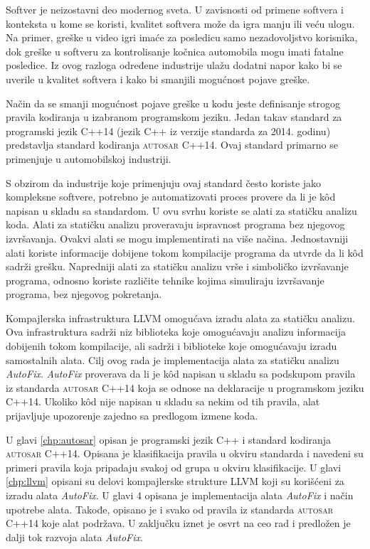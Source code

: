 \documentclass[12pt,oneside]{memoir}
\begin{document}
Softver je neizostavni deo modernog sveta. U zavisnosti od primene softvera i konteksta u kome se koristi, kvalitet softvera mo\v{z}e da igra
manju ili ve\'{c}u ulogu. Na primer, gre\v{s}ke u video igri ima\'{c}e za posledicu samo nezadovoljstvo korisnika, dok gre\v{s}ke u softveru
za kontrolisanje ko\v{c}nica automobila mogu imati fatalne posledice. Iz ovog razloga određene industrije ula\v{z}u dodatni napor kako bi se uverile u kvalitet softvera
i kako bi smanjili mogu\'{c}nost pojave gre\v{s}ke. \par
Na\v{c}in da se smanji mogu\'{c}nost pojave gre\v{s}ke u kodu jeste definisanje strogog pravila kodiranja u
izabranom programskom jeziku. Jedan takav standard za programski jezik C++14 (jezik C++ iz verzije standarda za 2014. godinu) predstavlja standard kodiranja \textsc{autosar} C++14. Ovaj standard primarno se primenjuje u automobilskoj industriji. \par
S obzirom da industrije koje primenjuju ovaj standard \v{c}esto koriste jako kompleksne softvere, potrebno je automatizovati proces provere da li je k\^{o}d napisan u skladu sa standardom. U ovu svrhu koriste
se alati za stati\v{c}ku analizu koda. Alati za stati\v{c}ku analizu proveravaju ispravnost programa bez njegovog izvr\v{s}avanja. Ovakvi alati se mogu implementirati na
vi\v{s}e na\v{c}ina. Jednostavniji alati koriste informacije dobijene tokom kompilacije programa da utvrde da li k\^{o}d sadr\v{z}i gre\v{s}ku. Napredniji alati za stati\v{c}ku analizu vr\v{s}e i simboli\v{c}ko izvr\v{s}avanje programa, odnosno koriste razli\v{c}ite tehnike kojima simuliraju izvr\v{s}avanje programa, bez njegovog pokretanja.
\par
Kompajlerska infrastruktura LLVM omogu\'{c}ava izradu alata za stati\v{c}ku analizu. Ova infrastruktura sadr\v{z}i niz biblioteka koje omogu\'{c}avaju analizu informacija dobijenih tokom kompilacije, ali sadr\v{z}i i biblioteke koje omogu\'{c}avaju izradu samostalnih alata. Cilj ovog rada je implementacija alata za stati\v{c}ku analizu
\textit{AutoFix}. \textit{AutoFix} proverava da li je k\^{o}d napisan u skladu sa podskupom pravila iz standarda \textsc{autosar} C++14 koja se odnose na deklaracije u programskom jeziku C++14. Ukoliko k\^{o}d nije napisan u skladu sa nekim od tih pravila, alat prijavljuje upozorenje zajedno sa predlogom izmene koda. 

U glavi \ref{chp:autosar} opisan je programski jezik C++ i standard kodiranja \textsc{autosar} C++14. Opisana je klasifikacija pravila u okviru standarda i navedeni su primeri pravila koja pripadaju svakoj od grupa u okviru klasifikacije. U glavi \ref{chp:llvm} opisani su delovi kompajlerske strukture LLVM koji su kori\v{s}\'{c}eni za izradu alata \textit{AutoFix}. U glavi 4 opisana je implementacija alata \textit{AutoFix} i na\v{c}in upotrebe alata. Takođe, opisano je i svako od pravila iz standarda \textsc{autosar} C++14 koje alat podr\v{z}ava. U zaklju\v{c}ku iznet je osvrt na ceo rad i predlo\v{z}en je dalji tok razvoja alata \textit{AutoFix}.
\end{document}

